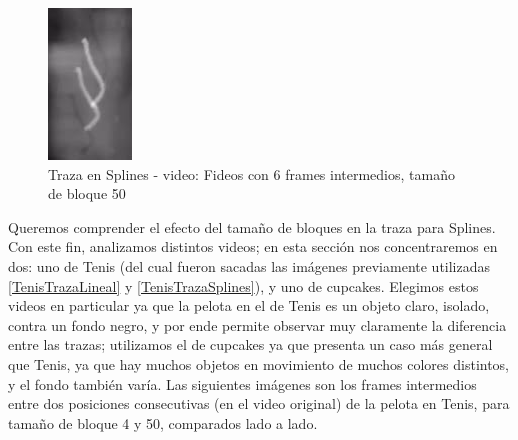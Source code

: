 \FloatBarrier
\begin{figure}[h]
\caption{Traza en Splines - video: Fideos con 6 frames intermedios, tama\~no de bloque 50}
\label{FideosSplinesTrazaArtifact}
\includegraphics[width=0.9\columnwidth]{imagenes/cualitativos/FSTA.png}
\end{figure}
\FloatBarrier

\par Queremos comprender el efecto del tama\~no de bloques en la traza para Splines.
Con este fin, analizamos distintos videos; en esta secci\'on nos concentraremos en dos: uno de Tenis (del cual fueron sacadas las im\'agenes previamente utilizadas \ref{TenisTrazaLineal} y \ref{TenisTrazaSplines}), y uno de cupcakes.
Elegimos estos videos en particular ya que la pelota en el de Tenis es un objeto claro, isolado, contra un fondo negro, y por ende permite observar muy claramente la diferencia entre las trazas; 
utilizamos el de cupcakes ya que presenta un caso m\'as general que Tenis, ya que hay muchos objetos en movimiento de muchos colores distintos, y el fondo tambi\'en var\'ia.
Las siguientes im\'agenes son los frames intermedios entre dos posiciones consecutivas (en el video original) de la pelota en Tenis, para tama\~no de bloque 4 y 50, comparados lado a lado.


